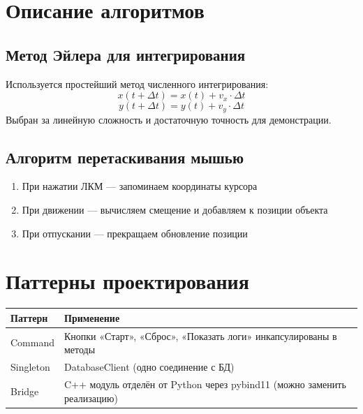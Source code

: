 \documentclass[a4paper,14pt]{extarticle}
\begin{document}
\section{Описание алгоритмов}

\subsection{Метод Эйлера для интегрирования}
Используется простейший метод численного интегрирования:
\[
x(t + \Delta t) = x(t) + v_x \cdot \Delta t
\]
\[
y(t + \Delta t) = y(t) + v_y \cdot \Delta t
\]
Выбран за линейную сложность и достаточную точность для демонстрации.

\subsection{Алгоритм перетаскивания мышью}
\begin{enumerate}
    \item При нажатии ЛКМ — запоминаем координаты курсора
    \item При движении — вычисляем смещение и добавляем к позиции объекта
    \item При отпускании — прекращаем обновление позиции
\end{enumerate}

\section{Паттерны проектирования}

\begin{table}[H]
\centering
\begin{tabular}{|p{4cm}|p{10cm}|}
\hline
\textbf{Паттерн} & \textbf{Применение} \\
\hline
Command & Кнопки «Старт», «Сброс», «Показать логи» инкапсулированы в методы \\
\hline
Singleton & DatabaseClient (одно соединение с БД) \\
\hline
Bridge & C++ модуль отделён от Python через pybind11 (можно заменить реализацию) \\
\hline
\end{tabular}
\end{table}
\end{document}
